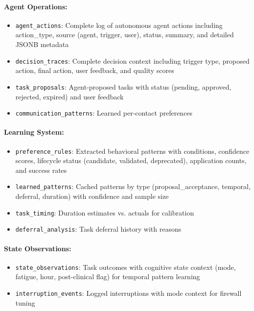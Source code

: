 \documentclass[11pt,a4paper]{article}
\begin{document}
\paragraph{Agent Operations:}
\begin{itemize}
    \item \texttt{agent\_actions}: Complete log of autonomous agent actions including action\_type, source (agent, trigger, user), status, summary, and detailed JSONB metadata
    \item \texttt{decision\_traces}: Complete decision context including trigger type, proposed action, final action, user feedback, and quality scores
    \item \texttt{task\_proposals}: Agent-proposed tasks with status (pending, approved, rejected, expired) and user feedback
    \item \texttt{communication\_patterns}: Learned per-contact preferences
\end{itemize}

\paragraph{Learning System:}
\begin{itemize}
    \item \texttt{preference\_rules}: Extracted behavioral patterns with conditions, confidence scores, lifecycle status (candidate, validated, deprecated), application counts, and success rates
    \item \texttt{learned\_patterns}: Cached patterns by type (proposal\_acceptance, temporal, deferral, duration) with confidence and sample size
    \item \texttt{task\_timing}: Duration estimates vs. actuals for calibration
    \item \texttt{deferral\_analysis}: Task deferral history with reasons
\end{itemize}

\paragraph{State Observations:}
\begin{itemize}
    \item \texttt{state\_observations}: Task outcomes with cognitive state context (mode, fatigue, hour, post-clinical flag) for temporal pattern learning
    \item \texttt{interruption\_events}: Logged interruptions with mode context for firewall tuning
\end{itemize}
\end{document}
